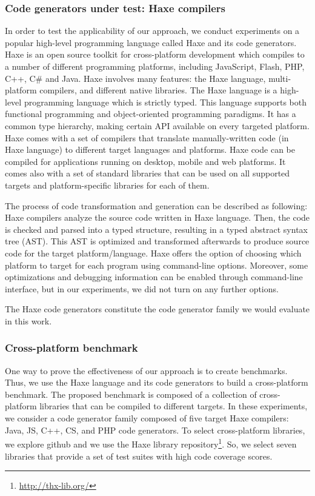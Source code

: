 \subsubsection{Code generators under test: Haxe compilers}
In order to test the applicability of our approach, we conduct experiments on a popular high-level programming language called Haxe and its code generators. Haxe is an open source toolkit for cross-platform development which compiles to a number of different programming platforms, including JavaScript, Flash, PHP, C++, C\# and Java. Haxe involves many features: the Haxe language, multi-platform compilers, and different native libraries. 
The Haxe language is a high-level programming language which is strictly typed. This language supports both functional programming and object-oriented programming paradigms. It has a common type hierarchy, making certain API available on every targeted platform.
Haxe comes with a set of compilers that translate manually-written code (in Haxe language) to different target languages and platforms. 
Haxe code can be compiled for applications running on desktop, mobile and web platforms. It comes also with a set of standard libraries that can be used on all supported targets and platform-specific libraries for each of them.

The process of code transformation and generation can be described as following: Haxe compilers analyze the source code written in Haxe language. Then, the code is checked and parsed into a typed structure, resulting in a typed abstract syntax tree (AST). This AST is optimized and transformed afterwards to produce source code for the target platform/language.
Haxe offers the option of choosing which platform to target for each program using command-line options. Moreover, some optimizations and debugging information can be enabled through command-line interface, but in our experiments, we did not turn on any further options. 

The Haxe code generators constitute the code generator family we would evaluate in this work.

\subsubsection{Cross-platform benchmark}
One way to prove the effectiveness of our approach is to create benchmarks. Thus, we use the Haxe language and its code generators to build a cross-platform benchmark. The proposed benchmark is composed of a collection of cross-platform libraries that can be compiled to different targets. In these experiments, we consider a code generator family composed of five target Haxe compilers: Java, JS, C++, CS, and PHP code generators. To select cross-platform libraries, we explore github and we use the Haxe library repository\footnote{\url{http://thx-lib.org/}}. So, we select seven libraries that provide a set of test suites with high code coverage scores. 

